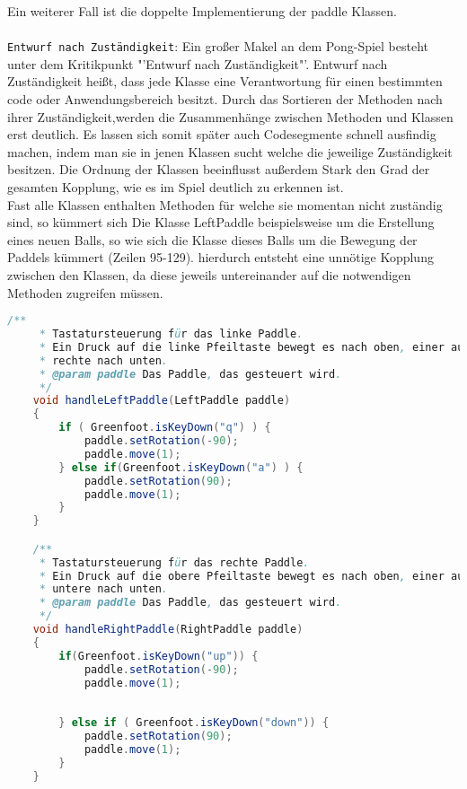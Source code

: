 \documentclass{pi1}
\begin{document}
Ein weiterer Fall ist die doppelte Implementierung der paddle Klassen.\\
\\
\texttt{Entwurf nach Zuständigkeit}:
Ein großer Makel an dem Pong-Spiel besteht unter dem Kritikpunkt "'Entwurf nach Zuständigkeit"'.
Entwurf nach Zuständigkeit heißt, dass jede Klasse  eine Verantwortung für einen bestimmten code oder Anwendungsbereich besitzt.
Durch das Sortieren der Methoden nach ihrer Zuständigkeit,werden die Zusammenhänge zwischen Methoden und Klassen erst deutlich.
Es lassen sich somit später auch Codesegmente schnell ausfindig machen, indem man sie in jenen Klassen sucht welche die jeweilige Zuständigkeit besitzen.
Die Ordnung der Klassen beeinflusst außerdem Stark den Grad der gesamten Kopplung, wie es im Spiel deutlich zu erkennen ist.\\
Fast alle Klassen enthalten Methoden für welche sie momentan nicht zuständig sind, so kümmert sich Die Klasse LeftPaddle beispielsweise um die Erstellung eines neuen Balls, so wie sich die Klasse dieses Balls um die Bewegung der Paddels kümmert (Zeilen 95-129).
hierdurch entsteht eine unnötige Kopplung zwischen den Klassen, da diese jeweils untereinander auf die notwendigen Methoden zugreifen müssen.
\begin{lstlisting}[caption={Klasse Ball Zeile 95-129}, firstnumber=95, language=Java]
        /**
     * Tastatursteuerung für das linke Paddle.
     * Ein Druck auf die linke Pfeiltaste bewegt es nach oben, einer auf die 
     * rechte nach unten.
     * @param paddle Das Paddle, das gesteuert wird.
     */
    void handleLeftPaddle(LeftPaddle paddle)
    {
        if ( Greenfoot.isKeyDown("q") ) {
            paddle.setRotation(-90);
            paddle.move(1);
        } else if(Greenfoot.isKeyDown("a") ) {
            paddle.setRotation(90);
            paddle.move(1);
        }
    }

    /**
     * Tastatursteuerung für das rechte Paddle.
     * Ein Druck auf die obere Pfeiltaste bewegt es nach oben, einer auf die 
     * untere nach unten.
     * @param paddle Das Paddle, das gesteuert wird.
     */
    void handleRightPaddle(RightPaddle paddle)
    {
        if(Greenfoot.isKeyDown("up")) {
            paddle.setRotation(-90);
            paddle.move(1);
            
            
        } else if ( Greenfoot.isKeyDown("down")) {
            paddle.setRotation(90);
            paddle.move(1);
        }
    }
    
\end{lstlisting}
\end{document}
